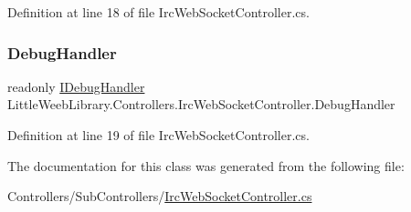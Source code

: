 Definition at line 18 of file Irc\+Web\+Socket\+Controller.\+cs.

\mbox{\label{class_little_weeb_library_1_1_controllers_1_1_irc_web_socket_controller_ac7ae7d3e2272f43e33217f61d322e21e}} 
\subsubsection{\texorpdfstring{Debug\+Handler}{DebugHandler}}
{\footnotesize\ttfamily readonly \mbox{\hyperlink{interface_little_weeb_library_1_1_handlers_1_1_i_debug_handler}{I\+Debug\+Handler}} Little\+Weeb\+Library.\+Controllers.\+Irc\+Web\+Socket\+Controller.\+Debug\+Handler\hspace{0.3cm}{\ttfamily [private]}}



Definition at line 19 of file Irc\+Web\+Socket\+Controller.\+cs.



The documentation for this class was generated from the following file\+:\begin{DoxyCompactItemize}
\item 
Controllers/\+Sub\+Controllers/\mbox{\hyperlink{_irc_web_socket_controller_8cs}{Irc\+Web\+Socket\+Controller.\+cs}}\end{DoxyCompactItemize}
